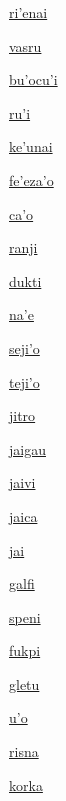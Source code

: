 {\hyperlink{val:rihenai}{ri'enai}}{}{}{}

{\hyperlink{val:vasru}{vasru}}{}{}{}

{\hyperlink{val:buhocuhi}{bu'ocu'i}}{}{}{}

{\hyperlink{val:ruhi}{ru'i}}{}{}{}

{\hyperlink{val:kehunai}{ke'unai}}{}{}{}

{\hyperlink{val:fehezaho}{fe'eza'o}}{}{}{}

{\hyperlink{val:caho}{ca'o}}{}{}{}

{\hyperlink{val:ranji}{ranji}}{}{}{}

{\hyperlink{val:dukti}{dukti}}{}{}{}

{\hyperlink{val:nahe}{na'e}}{}{}{}

{\hyperlink{val:sejiho}{seji'o}}{}{}{}

{\hyperlink{val:tejiho}{teji'o}}{}{}{}

{\hyperlink{val:jitro}{jitro}}{}{}{}

{\hyperlink{val:jaigau}{jaigau}}{}{}{}

{\hyperlink{val:jaivi}{jaivi}}{}{}{}

{\hyperlink{val:jaica}{jaica}}{}{}{}

{\hyperlink{val:jai}{jai}}{}{}{}

{\hyperlink{val:galfi}{galfi}}{}{}{}

{\hyperlink{val:speni}{speni}}{}{}{}

{\hyperlink{val:fukpi}{fukpi}}{}{}{}

{\hyperlink{val:gletu}{gletu}}{}{}{}

{\hyperlink{val:uho}{u'o}}{}{}{}

{\hyperlink{val:risna}{risna}}{}{}{}

{\hyperlink{val:korka}{korka}}{}{}{}

